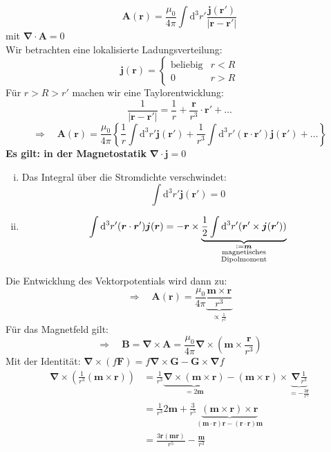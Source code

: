 \documentclass[titlepage,11pt,a4paper,ngerman]{report}
\newcommand*{\defeq}{\mathrel{\vcenter{\baselineskip0.5ex \lineskiplimit0pt \hbox{\scriptsize.}\hbox{\scriptsize.}}}=}
\newcommand{\tx}[1]{\textrm{#1}}
\newcommand{\ub}[1]{\underbrace{#1}}
\newcommand{\dd}{\tx{d}}
\newcommand{\casess}[4]{\left\{ \begin{array}{ll} {#1} & {#2} \\ {#3} & {#4} \end{array} \right.}
\renewcommand{\vec}[1]{\boldsymbol{#1}}
\newcommand{\vabla}{\boldsymbol{\nabla}}
\begin{document}
\begin{equation*}
\vec{A}(\vec{r}) = \frac{\mu_0}{4 \pi} \int \dd ^3 r' \frac{\vec{j}(\vec{r}')}{|\vec{r} - \vec{r}'|}
\end{equation*}
mit $ \vabla \cdot \vec{A} = 0 $\\
Wir betrachten eine lokalisierte Ladungsverteilung:
%
%
\begin{equation*}
\vec{j}(\vec{r}) = \casess{\tx{beliebig}}{r < R}{0}{r > R}
\end{equation*}
Für $ r > R > r' $ machen wir eine Taylorentwicklung:
\begin{equation*}
\frac{1}{|\vec{r} - \vec{r}'|} = \frac{1}{r} + \frac{\vec{r}}{r^3} \cdot \vec{r}' + \dots
\end{equation*}
\begin{equation*}
\Rightarrow \quad \vec{A}(\vec{r}) = \frac{\mu_0}{4 \pi} \left\{\frac{1}{r} \int \dd^3r' \vec{j} (\vec{r}') + \frac{1}{r^3} \int \dd ^3 r' (\vec{r} \cdot \vec{r}') \vec{j}(\vec{r}') + \dots \right\}
\end{equation*}
\textbf{Es gilt: in der Magnetostatik} $ \vabla \cdot \vec{j} = 0 $
\begin{enumerate}[i)]
	\item Das Integral über die Stromdichte verschwindet:\\
	$$ \int \dd ^3 r' \vec{j} (\vec{r}') = 0 $$
	\item $$ \int \dd^3 r' (\vec{r} \cdot \vec{r}') \vec{j}(\vec{r}) = - \vec{r} \times \ub{\frac{1}{2} \int \dd^3 r' (\vec{r}' \times \vec{j}(\vec{r}'))}_{\mathclap{\substack{\defeq \vec{m}\\ \tx{magnetisches} \\ \tx{Dipolmoment} }}} $$
\end{enumerate}
Die Entwicklung des Vektorpotentials wird dann zu:
\begin{equation*}
\Rightarrow \quad \vec{A}(\vec{r}) = \frac{\mu_0}{4 \pi} \ub{\frac{\vec{m} \times \vec{r}}{r^3}}_{\propto \frac{1}{r^2}}
\end{equation*}
Für das Magnetfeld gilt:
\begin{equation*}
\Rightarrow \quad \vec{B} = \vabla \times \vec{A} = \frac{\mu_0}{4 \pi} \vabla \times \left(\vec{m} \times \frac{\vec{r}}{r^3}\right)
\end{equation*}
Mit der Identität: $ \vabla \times (f \vec{F}) = f \vabla \times \vec{G} - \vec{G} \times \vabla f $
\begin{align*}
\vabla \times \left(\frac{1}{r^3} (\vec{m} \times \vec{r})\right) &= \frac{1}{r^3} \ub{\vabla \times (\vec{m} \times \vec{r})}_{= 2 \vec{m}} - (\vec{m} \times \vec{r}) \times \ub{\vabla \frac{1}{r^3}}_{= - \frac{3 \vec{r}}{r^5}}\\
&= \frac{1}{r^3} 2 \vec{m} + \frac{3}{r^5} \ub{(\vec{m} \times \vec{r}) \times \vec{r}}_{(\vec{m} \cdot \vec{r}) \vec{r} - (\vec{r} \cdot \vec{r}) \vec{m}}\\
&= \frac{3 \vec{r} (\vec{m} \vec{r})}{r^5} - \frac{\vec{m}}{r^3}
\end{align*}
\end{document}
